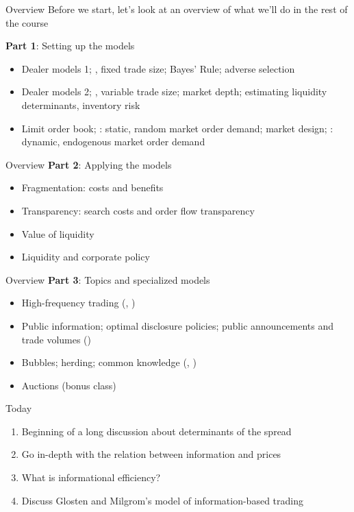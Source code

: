 \documentclass[english,10pt
,aspectratio=169
]{beamer}
\begin{document}
\begin{frame}{Overview}
	Before we start, let's look at an overview of what we'll do in the rest of the course
	
	\textbf{Part 1}: Setting up the models
	\begin{itemize}
	\item Dealer models 1; , fixed trade size; Bayes' Rule; adverse selection
	\item Dealer models 2; , variable trade size; market depth; estimating liquidity determinants, inventory risk
	\item Limit order book; : static, random market order demand; market design; : dynamic, endogenous market order demand
	\end{itemize}
\end{frame}


\begin{frame}{Overview}
\textbf{Part 2}: Applying the models
\begin{itemize}
	\item Fragmentation: costs and benefits
	\item Transparency: search costs and order flow transparency
	\item Value of liquidity
	\item Liquidity and corporate policy
\end{itemize}
\end{frame}


\begin{frame}{Overview}
\textbf{Part 3}: Topics and specialized models
\begin{itemize}
	\item High-frequency trading (, )
	\item Public information; optimal disclosure policies; public announcements and trade volumes ()
	\item Bubbles; herding; common knowledge (, )
	\item Auctions (bonus class)
\end{itemize}
\end{frame}


\begin{frame}{Today}
\begin{enumerate}
	\item Beginning of a long discussion about determinants of the spread
	\item Go in-depth with the relation between information and prices
	\item What is informational efficiency?
	\item Discuss Glosten and Milgrom's model of information-based trading
\end{enumerate}
\end{frame}
\end{document}
